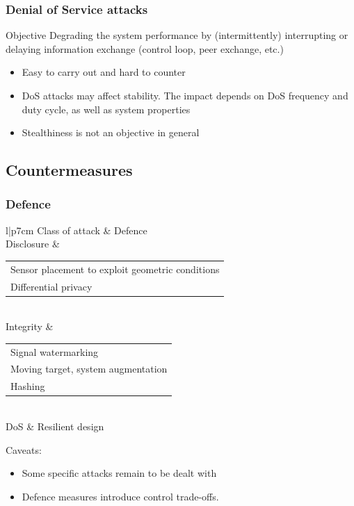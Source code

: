 \documentclass[presentation]{beamer}
\begin{document}
\begin{frame}
	\frametitle{Denial of Service attacks}

	\begin{block}{Objective}
		\centering
		Degrading the system performance by (intermittently) interrupting or delaying information exchange (control loop, peer exchange, etc.)
	\end{block}

	\vfill
	\begin{itemize}
		\item Easy to carry out and hard to counter

		\item DoS attacks may affect stability. 
		The impact depends on DoS frequency and duty cycle, as well as system properties

		\item Stealthiness is not an objective in general
	\end{itemize}
\end{frame}

\subsection{Countermeasures}

\begin{frame}
	\frametitle{Defence}
	\centering\footnotesize
	\renewcommand{\arraystretch}{1.5}
	\begin{tabular}{l|p{7cm}}
		Class of attack & Defence \\
		\hline
		Disclosure & 
		\renewcommand{\arraystretch}{1.2}
		\begin{tabular}{p{6cm}}			
			\tabitem Sensor placement to exploit geometric conditions \\  \tabitem Differential privacy
		\end{tabular} \\
		\hline 
		Integrity & 
		\renewcommand{\arraystretch}{1.2}
		\begin{tabular}{l}
			\tabitem Signal watermarking \\ 
			\tabitem Moving target, system augmentation \\
			\tabitem Hashing
		\end{tabular} \\
		\hline
		DoS & Resilient design
	\end{tabular}

	\raggedright\vfill
	Caveats:
	\begin{itemize}
		\item Some specific attacks remain to be dealt with
		\item Defence measures introduce control trade-offs.
	\end{itemize}
\end{frame}
\end{document}
